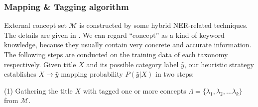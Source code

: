\subsubsection{Mapping \& Tagging algorithm}
External concept set $\mathcal{M}$ is constructed by some hybrid NER-related techniques. The details are given in .
We can regard ``concept'' as a kind of keyword knowledge, because they usually contain very concrete and accurate information.
The following steps are conducted on the training data of each taxonomy respectively.
Given title $X$ and its possible category label $\hat{y}$, our heuristic strategy establishes $X \rightarrow \hat{y}$ mapping probability $P(\hat{y} | X)$ in two steps: 

(1) Gathering the title $X$ with tagged one or more concepts $\Lambda=\{\lambda_1, \lambda_2, ... \lambda_k\}$ from $\mathcal{M}$. 

